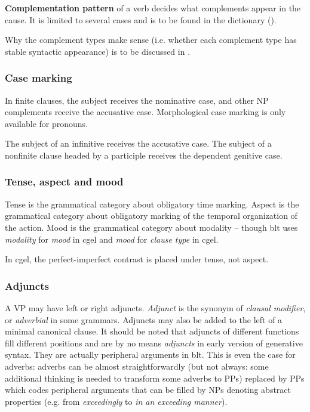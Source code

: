 \documentclass{article}
\newcommand*{\concept}[1]{\textbf{#1}}
\newcommand*{\term}[1]{\emph{#1}}
\newcommand*{\corpus}[1]{\emph{#1}}
\begin{document}
\concept{Complementation pattern} of a verb decides what complements appear in the cause.
It is limited to several cases 
and is to be found in the dictionary ().

Why the complement types make sense (i.e. whether each complement type has stable syntactic appearance)
is to be discussed in .

\subsubsection{Case marking}\label{sec:case-marking-clause}

In finite clauses, the subject receives the nominative case, 
and other NP complements receive the accusative case.
Morphological case marking is only available for pronouns.

The subject of an infinitive receives the accusative case.
The subject of a nonfinite clause headed by a participle 
receives the dependent genitive case.

\subsubsection{Tense, aspect and mood}\label{sec:tense-aspect}

Tense is the grammatical category about obligatory time marking.
Aspect is the grammatical category about obligatory marking of the temporal organization of the action.
Mood is the grammatical category about modality -- 
though \ac{blt} uses \term{modality} for \term{mood} in \ac{cgel} 
and \term{mood} for \term{clause type} in \ac{cgel}.

In \ac{cgel}, the perfect-imperfect contrast is placed under tense, not aspect.

\subsubsection{Adjuncts}\label{sec:adjunct}

A VP may have left or right adjuncts. 
\term{Adjunct} is the synonym of \term{clausal modifier},
or \term{adverbial} in some grammars.
Adjuncts may also be added to the left of a minimal canonical clause.
It should be noted that adjuncts of different functions fill different positions
and are by no means \term{adjuncts} in early version of generative syntax.
They are actually peripheral arguments in \ac{blt}.
This is even the case for adverbs: 
adverbs can be almost straightforwardly 
(but not always: some additional thinking is needed to transform some adverbs to PPs) 
replaced by PPs which codes peripheral arguments 
that can be filled by NPs denoting abstract properties
(e.g. from \corpus{exceedingly} to \corpus{in an exceeding manner}).
\end{document}
